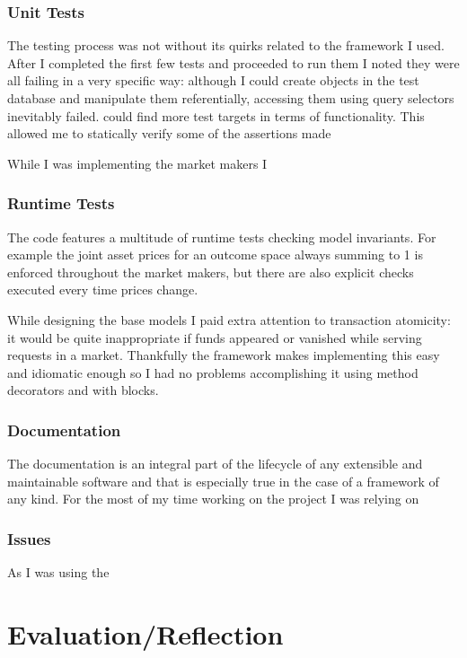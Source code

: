 \documentclass[bsc,frontabs,twoside,singlespacing,parskip,deptreport]{infthesis}     %
\begin{document}
\subsection{Unit Tests}

	The testing process was not without its quirks related to the framework I used. After I completed the first few tests and proceeded to run them I noted they were all failing in a very specific way: although I could create objects in the test database and manipulate them referentially, accessing them using query selectors inevitably failed. could find more test targets in terms of functionality. This allowed me to statically verify some of the assertions made 
	
	While I was implementing the market makers I 
	
\subsection{Runtime Tests}
    
    The code features a multitude of runtime tests checking model invariants. For example the joint asset prices for an outcome space always summing to 1 is enforced throughout the market makers, but there are also explicit checks executed every time prices change.

    While designing the base models I paid extra attention to transaction atomicity: it would be quite inappropriate if funds appeared or vanished while serving requests in a market. Thankfully the framework makes implementing this easy and idiomatic enough so I had no problems accomplishing it using method decorators and with blocks.

\subsection{Documentation}

    The documentation is an integral part of the lifecycle of any extensible and maintainable software and that is especially true in the case of a framework of any kind. For the most of my time working on the project I was relying on 
    
\subsection{Issues}
    As I was using the 
    
\chapter{Evaluation/Reflection}
\end{document}
